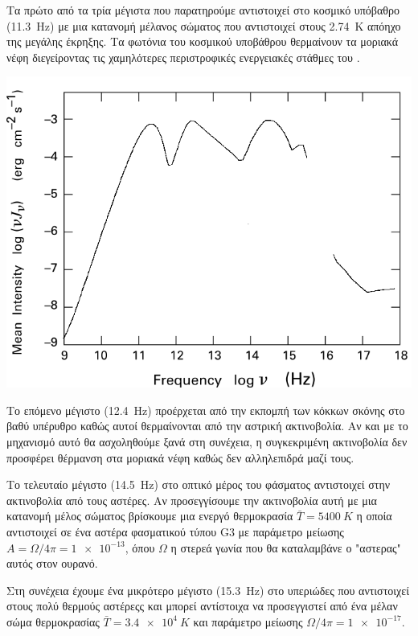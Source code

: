 Τα πρώτο από τα τρία μέγιστα που παρατηρούμε αντιστοιχεί στο κοσμικό υπόβαθρο (\SI{11.3}{Hz}) με μια κατανομή μέλανος σώματος που αντιστοιχεί στους \SI{2.74}{K} απόηχο της μεγάλης έκρηξης. Τα φωτόνια του κοσμικού υποβάθρου θερμαίνουν τα μοριακά νέφη διεγείροντας τις χαμηλότερες περιστροφικές ενεργειακές στάθμες του .

\begin{marginfigure}
	\centering
	\includegraphics[width=1\linewidth]{Images/interstellarradiation}
	\caption{}
	\label{fig:interstellarradiation}
\end{marginfigure}

Το επόμενο μέγιστο (\SI{12.4}{Hz}) προέρχεται από την εκπομπή των κόκκων σκόνης στο βαθύ υπέρυθρο καθώς αυτοί θερμαίνονται από την αστρική ακτινοβολία. Αν και με το μηχανισμό αυτό θα ασχοληθούμε ξανά στη συνέχεια,  η συγκεκριμένη ακτινοβολία δεν προσφέρει θέρμανση στα μοριακά νέφη καθώς δεν αλληλεπιδρά μαζί τους.

Το τελευταίο μέγιστο (\SI{14.5}{Hz}) στο οπτικό μέρος του φάσματος αντιστοιχεί στην ακτινοβολία από τους αστέρες. Αν προσεγγίσουμε την ακτινοβολία αυτή με μια κατανομή μέλος σώματος βρίσκουμε μια ενεργό θερμοκρασία $\bar{T}=\SI{5400}{K}$ η οποία αντιστοιχεί σε ένα αστέρα φασματικού τύπου G3 με παράμετρο μείωσης $A=\Omega/4\pi= \num{1e-13}$, όπου $\Omega$ η στερεά γωνία που θα καταλαμβάνε ο "αστερας" αυτός στον ουρανό.

Στη συνέχεια έχουμε ένα μικρότερο μέγιστο (\SI{15.3}{Hz}) στο υπεριώδες που αντιστοιχεί στους πολύ θερμούς αστέρεςς και μπορεί αντίστοιχα να προσεγγιστεί από ένα μέλαν σώμα θερμοκρασίας $\bar{T}=\SI{3.4e4}{K}$ και παράμετρο μείωσης  $\Omega/4\pi= \num{1e-17}$. 

